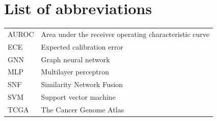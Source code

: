 \section*{List of abbreviations}

\begin{tabular}{@{}ll@{}}
AUROC & Area under the receiver operating characteristic curve\\
ECE & Expected calibration error\\
GNN & Graph neural network\\
MLP & Multilayer perceptron\\
SNF & Similarity Network Fusion\\
SVM & Support vector machine\\
TCGA & The Cancer Genome Atlas
\end{tabular}
